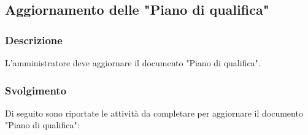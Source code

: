 \subsection{Aggiornamento delle "Piano di qualifica"}
\label{aggiornare-ndp}

\subsubsection{Descrizione}

L'amministratore deve aggiornare il documento "Piano di qualifica".

\subsubsection{Svolgimento}
Di seguito sono riportate le attività da completare per aggiornare il documento
"Piano di qualifica":
